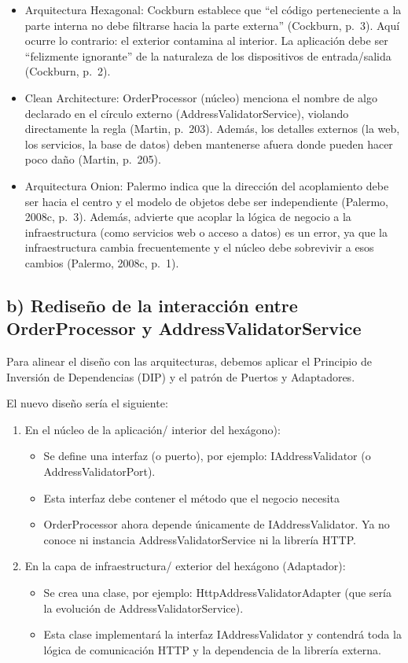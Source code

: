 \documentclass[12pt,a4paper]{article}
\begin{document}
\begin{itemize}[label=$\cdot$]
  \item Arquitectura Hexagonal: Cockburn establece que ``el código perteneciente a la parte interna no debe filtrarse hacia la parte externa'' (Cockburn, p.~3). Aquí ocurre lo contrario: el exterior contamina al interior. La aplicación debe ser ``felizmente ignorante'' de la naturaleza de los dispositivos de entrada/salida (Cockburn, p.~2).
  \item Clean Architecture: OrderProcessor (núcleo) menciona el nombre de algo declarado en el círculo externo (AddressValidatorService), violando directamente la regla (Martin, p.~203). Además, los detalles externos (la web, los servicios, la base de datos) deben mantenerse afuera donde pueden hacer poco daño (Martin, p.~205).
  \item Arquitectura Onion: Palermo indica que la dirección del acoplamiento debe ser hacia el centro y el modelo de objetos debe ser independiente (Palermo, 2008c, p.~3). Además, advierte que acoplar la lógica de negocio a la infraestructura (como servicios web o acceso a datos) es un error, ya que la infraestructura cambia frecuentemente y el núcleo debe sobrevivir a esos cambios (Palermo, 2008c, p.~1).
\end{itemize}

\subsection{b) Rediseño de la interacción entre OrderProcessor y AddressValidatorService}

Para alinear el diseño con las arquitecturas, debemos aplicar el Principio de Inversión de Dependencias (DIP) y el patrón de Puertos y Adaptadores.

El nuevo diseño sería el siguiente:

\begin{enumerate}
  \item En el núcleo de la aplicación/ interior del hexágono):
  \begin{itemize}[label=$\cdot$]
    \item Se define una interfaz (o puerto), por ejemplo: IAddressValidator (o AddressValidatorPort).
    \item Esta interfaz debe contener el método que el negocio necesita
    \item OrderProcessor ahora depende únicamente de IAddressValidator. Ya no conoce ni instancia AddressValidatorService ni la librería HTTP.
  \end{itemize}
  \item En la capa de infraestructura/ exterior del hexágono (Adaptador):
  \begin{itemize}[label=$\cdot$]
    \item Se crea una clase, por ejemplo: HttpAddressValidatorAdapter (que sería la evolución de AddressValidatorService).
    \item Esta clase implementará la interfaz IAddressValidator y contendrá toda la lógica de comunicación HTTP y la dependencia de la librería externa.
  \end{itemize}
\end{enumerate}
\end{document}
